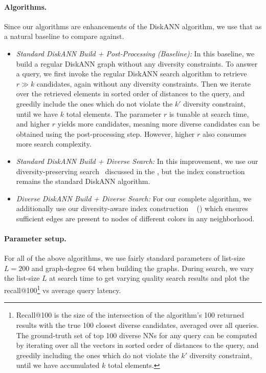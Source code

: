 \paragraph{Algorithms.} Since our algorithms are enhancements of the DiskANN algorithm, we use that as a natural baseline to compare against. 



\begin{itemize}[leftmargin=*]
\item {\em Standard DiskANN Build + Post-Processing (Baseline):} In this baseline, we build a regular DiskANN graph without any diversity constraints. To answer a query, we first invoke the regular DiskANN search algorithm to retrieve $r \gg k$ candidates, again without any diversity constraints. Then we iterate over the retrieved elements in sorted order of distances to the query, and greedily include the ones which do not violate the $k'$ diversity constraint, until we have  $k$ total elements. The parameter $r$ is tunable at search time, and higher $r$ yields more candidates, meaning more diverse candidates can be obtained using the post-processing step. However, higher $r$ also consumes more search complexity. 

\item{\em Standard DiskANN Build + Diverse Search:} In this improvement, we use our diversity-preserving search~ discussed in the , but the index construction remains the standard DiskANN algorithm.

\item {\em Diverse DiskANN Build + Diverse Search:} For our complete algorithm, we additionally use our diversity-aware index construction ~ () which ensures sufficient edges are present to nodes of different colors in any neighborhood. 
\end{itemize}


\paragraph{Parameter setup.} For all of the above algorithms, we use fairly standard parameters of list-size $L=200$ and graph-degree $64$ when building the graphs. During search, we vary the list-size $L$ at search time to get varying quality search results and plot the recall@100\footnote{Recall@100 is the  size of the intersection of the algorithm's 100 returned results with the true 100 closest diverse candidates, averaged over all queries. The ground-truth set of top 100 diverse NNs for any query can be computed by iterating over all the vectors in sorted order of distances to the query, and greedily including the ones which do not violate the $k'$ diversity constraint, until we have accumulated $k$ total elements.} vs average query latency. 



